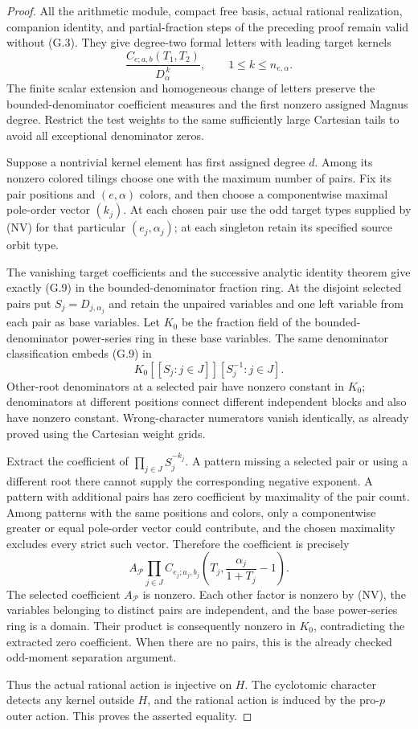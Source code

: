 \begin{proof}
All the arithmetic module, compact free basis, actual rational realization, companion identity, and partial-fraction steps of the preceding proof remain valid without (G.3). They give degree-two formal letters with leading target kernels
\[
 \frac{C_{e;a,b}(T_1,T_2)}{D_\alpha^{\,k}},
 \qquad 1\le k\le n_{e,\alpha}.
\]
The finite scalar extension and homogeneous change of letters preserve the bounded-denominator coefficient measures and the first nonzero assigned Magnus degree. Restrict the test weights to the same sufficiently large Cartesian tails to avoid all exceptional denominator zeros.

Suppose a nontrivial kernel element has first assigned degree $d$. Among its nonzero colored tilings choose one with the maximum number of pairs. Fix its pair positions and $(e,\alpha)$ colors, and then choose a componentwise maximal pole-order vector $(k_j)$. At each chosen pair use the odd target types supplied by (NV) for that particular $(e_j,\alpha_j)$; at each singleton retain its specified source orbit type.

The vanishing target coefficients and the successive analytic identity theorem give exactly (G.9) in the bounded-denominator fraction ring. At the disjoint selected pairs put $S_j=D_{j,\alpha_j}$ and retain the unpaired variables and one left variable from each pair as base variables. Let $K_0$ be the fraction field of the bounded-denominator power-series ring in these base variables. The same denominator classification embeds (G.9) in
\[
 K_0[[S_j:j\in J]][S_j^{-1}:j\in J].
\]
Other-root denominators at a selected pair have nonzero constant in $K_0$; denominators at different positions connect different independent blocks and also have nonzero constant. Wrong-character numerators vanish identically, as already proved using the Cartesian weight grids.

Extract the coefficient of $\prod_{j\in J}S_j^{-k_j}$. A pattern missing a selected pair or using a different root there cannot supply the corresponding negative exponent. A pattern with additional pairs has zero coefficient by maximality of the pair count. Among patterns with the same positions and colors, only a componentwise greater or equal pole-order vector could contribute, and the chosen maximality excludes every strict such vector. Therefore the coefficient is precisely
\[
 A_{\mathcal P}\prod_{j\in J}
 C_{e_j;a_j,b_j}\!\left(T_j,\frac{\alpha_j}{1+T_j}-1\right).
\]
The selected coefficient $A_{\mathcal P}$ is nonzero. Each other factor is nonzero by (NV), the variables belonging to distinct pairs are independent, and the base power-series ring is a domain. Their product is consequently nonzero in $K_0$, contradicting the extracted zero coefficient. When there are no pairs, this is the already checked odd-moment separation argument.

Thus the actual rational action is injective on $H$. The cyclotomic character detects any kernel outside $H$, and the rational action is induced by the pro-$p$ outer action. This proves the asserted equality.
\end{proof}

